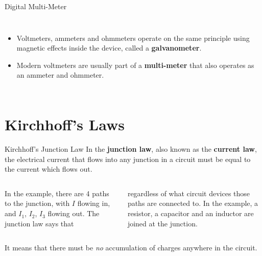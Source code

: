 \documentclass[12pt,aspectratio=169]{beamer}
\begin{document}
\begin{frame}{Digital Multi-Meter}
  \begin{columns}

    \begin{itemize}
    \item Voltmeters, ammeters and ohmmeters operate on the same principle
      using magnetic effects inside the device, called a \textbf{galvanometer}.
    \item Modern voltmeters are usually part of a \textbf{multi-meter} that
      also operates as an ammeter and ohmmeter.
    \end{itemize}
  \end{columns}
\end{frame}



\section{Kirchhoff's Laws}

\begin{frame}{Kirchhoff's Junction Law}
  In the \textbf{junction law}, also known as the \textbf{current law}, the
  electrical current that flows into any junction in a circuit must be equal to
  the current which flows out.

  \vspace{.05in}
  \begin{columns}[T]
    \centering
    
    In the example, there are 4 paths to the junction, with $I$ flowing in, and
    $I_1$, $I_2$, $I_3$ flowing out. The junction law says that


    \vspace{-.18in}regardless of what circuit devices those paths are connected
    to. In the example, a resistor, a capacitor and an inductor are joined at
    the junction.
  \end{columns}
  \vspace{.1in}It means that there must be \emph{no} accumulation of charges
  anywhere in the circuit.
\end{frame}
\end{document}
